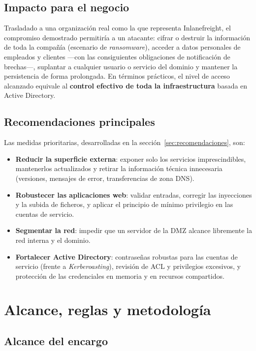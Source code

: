 \documentclass[11pt,a4paper,oneside]{report}
\begin{document}
\section{Impacto para el negocio}

Trasladado a una organización real como la que representa Inlanefreight, el compromiso demostrado permitiría a un atacante: cifrar o destruir la información de toda la compañía (escenario de \emph{ransomware}), acceder a datos personales de empleados y clientes —con las consiguientes obligaciones de notificación de brechas—, suplantar a cualquier usuario o servicio del dominio y mantener la persistencia de forma prolongada. En términos prácticos, el nivel de acceso alcanzado equivale al \textbf{control efectivo de toda la infraestructura} basada en Active Directory.

\section{Recomendaciones principales}

Las medidas prioritarias, desarrolladas en la sección~\ref{sec:recomendaciones}, son:
\begin{itemize}
  \item \textbf{Reducir la superficie externa}: exponer solo los servicios imprescindibles, mantenerlos actualizados y retirar la información técnica innecesaria (versiones, mensajes de error, transferencias de zona DNS).
  \item \textbf{Robustecer las aplicaciones web}: validar entradas, corregir las inyecciones y la subida de ficheros, y aplicar el principio de mínimo privilegio en las cuentas de servicio.
  \item \textbf{Segmentar la red}: impedir que un servidor de la DMZ alcance libremente la red interna y el dominio.
  \item \textbf{Fortalecer Active Directory}: contraseñas robustas para las cuentas de servicio (frente a \emph{Kerberoasting}), revisión de ACL y privilegios excesivos, y protección de las credenciales en memoria y en recursos compartidos.
\end{itemize}

\chapter{Alcance, reglas y metodología}

\section{Alcance del encargo}
\end{document}
